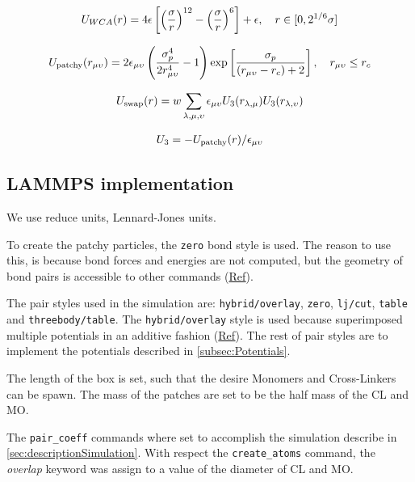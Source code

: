 \documentclass[main.tex]{subfiles}
\begin{document}
\begin{gather}
    U_{WCA}(r) = 4\epsilon\left[\qty(\frac{\sigma}{r})^{12}-\qty(\frac{\sigma}{r})^6\right]+\epsilon,\quad r\in[0,2^{1/6}\sigma]\label{eqn:CL-MO_interaction}
\end{gather}

\begin{gather}
	U_{\mathrm{patchy}}\qty(r_{\mu\upsilon}) = 2\epsilon_{\mu\upsilon}\left(\frac{\sigma_p^4}{2 r_{\mu\upsilon}^4}-1\right)\exp\left[\frac{\sigma_p}{\qty(r_{\mu\upsilon}-r_{c})+2}\right],\quad r_{\mu\upsilon}\leq r_c \label{eqn:patch-patch_interaction}
\end{gather}

\begin{gather}
	U_{\mathrm{swap}}(r) = w\sum_{\lambda,\mu,\upsilon}\epsilon_{\mu\upsilon}U_3\qty(r_{\lambda,\mu})U_3\qty(r_{\lambda,\upsilon})\label{eqn:swap_interaction}
\end{gather}

\begin{gather}
	U_{3} = -U_{\mathrm{patchy}}\qty(r)/\epsilon_{\mu\upsilon}\label{eqn:swapmod_interaction}
\end{gather}

\subsection{LAMMPS implementation}

We use reduce units, Lennard-Jones units.

To create the patchy particles, the \verb|zero| bond style is used.
The reason to use this, is because bond forces and energies are not computed, but the geometry of bond pairs is accessible to other commands (\href{https://docs.lammps.org/bond_zero.html}{Ref}).

The pair styles used in the simulation are: \verb|hybrid/overlay|, \verb|zero|, \verb|lj/cut|, \verb|table| and \verb|threebody/table|.
The \verb|hybrid/overlay| style is used because superimposed multiple potentials in an additive fashion (\href{https://docs.lammps.org/pair_hybrid.html}{Ref}).
The rest of pair styles are to implement the potentials described in \ref{subsec:Potentials}.

The length of the box is set, such that the desire Monomers and Cross-Linkers can be spawn.
The mass of the patches are set to be the half mass of the CL and MO.

The \verb|pair_coeff| commands where set to accomplish the simulation describe in \ref{sec:descriptionSimulation}.
With respect the \verb|create_atoms| command, the \textit{overlap} keyword was assign to a value of the diameter of CL and MO.
\end{document}
